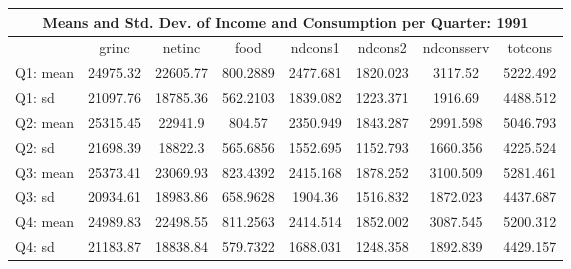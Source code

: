 \begin{tabular}{l*{7}{c}}
\hline\hline
\multicolumn{8}{c}{Means and Std. Dev. of Income and Consumption per Quarter: 1991}  \\
\hline    
            &       grinc&      netinc&        food&     ndcons1&     ndcons2&  ndconsserv&     totcons\\
\hline
Q1: mean       &    24975.32&    22605.77&    800.2889&    2477.681&    1820.023&     3117.52&    5222.492\\
Q1: sd   &    21097.76&    18785.36&    562.2103&    1839.082&    1223.371&     1916.69&    4488.512\\
Q2: mean    &    25315.45&     22941.9&      804.57&    2350.949&    1843.287&    2991.598&    5046.793\\
Q2: sd     &    21698.39&     18822.3&    565.6856&    1552.695&    1152.793&    1660.356&    4225.524\\
Q3: mean    &    25373.41&    23069.93&    823.4392&    2415.168&    1878.252&    3100.509&    5281.461\\
Q3: sd     &    20934.61&    18983.86&    658.9628&     1904.36&    1516.832&    1872.023&    4437.687\\
Q4: mean    &    24989.83&    22498.55&    811.2563&    2414.514&    1852.002&    3087.545&    5200.312\\
Q4: sd   &    21183.87&    18838.84&    579.7322&    1688.031&    1248.358&    1892.839&    4429.157\\
\hline\hline
\end{tabular}
